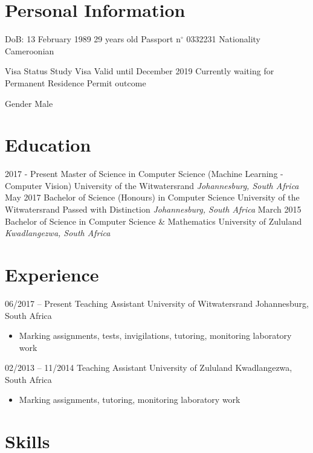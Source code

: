 \documentclass[letterpaper]{moderncv}        %
\begin{document}
\makecvtitle

\section{Personal Information}
\cventry
{DoB:}
{13 February 1989}
{29 years old}
{}
{}
{}
\cventry
{Passport n$^\circ$}
{0332231}
{}
{}
{}
{}
\cventry
{Nationality}
{Cameroonian}
{}
{}
{}
{}

\cventry
{Visa Status}
{Study Visa}
{Valid until December 2019}
{Currently waiting for Permanent Residence Permit outcome}
{}
{}

\cventry
{Gender}
{Male}
{}
{}
{}
{}

\section{Education}
\cventry
{2017 - Present}
{Master of Science in Computer Science (Machine Learning - Computer Vision)}
{University of the Witwatersrand}
{}
{\textit{Johannesburg, South Africa}}
{}
\cventry
{May 2017}
{Bachelor of Science (Honours) in Computer Science}
{University of the Witwatersrand}
{Passed with Distinction}
{\textit{Johannesburg, South Africa}}
{}
\cventry
{March 2015}
{Bachelor of Science in Computer Science \& Mathematics}
{University of Zululand}
{}
{\textit{Kwadlangezwa, South Africa}}
{}
\section{Experience}
\cventry
{06/2017 -- Present}
{Teaching Assistant}
{University of Witwatersrand}
{Johannesburg, South Africa}
{}
{\begin{itemize}%
	\item Marking assignments, tests, invigilations, tutoring, monitoring laboratory work
	\end{itemize}}
\cventry
{02/2013 -- 11/2014}
{Teaching Assistant}
{University of Zululand}
{Kwadlangezwa, South Africa}
{}
{\begin{itemize}%
	\item Marking assignments, tutoring, monitoring laboratory work
	\end{itemize}}
\section{Skills}
\end{document}
